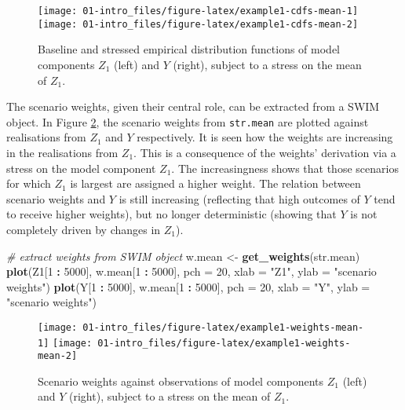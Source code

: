 \documentclass[]{article}
\newenvironment{Shaded}{\begin{snugshade}}{\end{snugshade}}
\newcommand{\CommentTok}[1]{\textcolor[rgb]{0.56,0.35,0.01}{\textit{#1}}}
\newcommand{\DataTypeTok}[1]{\textcolor[rgb]{0.13,0.29,0.53}{#1}}
\newcommand{\DecValTok}[1]{\textcolor[rgb]{0.00,0.00,0.81}{#1}}
\newcommand{\KeywordTok}[1]{\textcolor[rgb]{0.13,0.29,0.53}{\textbf{#1}}}
\newcommand{\NormalTok}[1]{#1}
\newcommand{\OperatorTok}[1]{\textcolor[rgb]{0.81,0.36,0.00}{\textbf{#1}}}
\newcommand{\StringTok}[1]{\textcolor[rgb]{0.31,0.60,0.02}{#1}}
\begin{document}
\begin{figure}
\texttt{[image: 01-intro\_files/figure-latex/example1-cdfs-mean-1]} \texttt{[image: 01-intro\_files/figure-latex/example1-cdfs-mean-2]} \caption{Baseline and stressed empirical distribution functions of model components  $Z_1$ (left) and $Y$ (right), subject to a stress on the mean of $Z_1$.}\label{fig:example1-cdfs-mean}
\end{figure}

The scenario weights, given their central role, can be extracted from a SWIM object. In Figure \ref{fig:example1-weights-mean}, the scenario weights from \texttt{str.mean} are plotted against realisations from \(Z_1\) and \(Y\) respectively. It is seen how the weights are increasing in the realisations from \(Z_1\). This is a consequence of the weights' derivation via a stress on the model component \(Z_1\). The increasingness shows that those scenarios for which \(Z_1\) is largest are assigned a higher weight. The relation between scenario weights and \(Y\) is still increasing (reflecting that high outcomes of \(Y\) tend to receive higher weights), but no longer deterministic (showing that \(Y\) is not completely driven by changes in \(Z_1\)).

\begin{Shaded}
\begin{Highlighting}[]
\CommentTok{# extract weights from SWIM object}
\NormalTok{w.mean <-}\StringTok{ }\KeywordTok{get_weights}\NormalTok{(str.mean)}
\KeywordTok{plot}\NormalTok{(Z1[}\DecValTok{1} \OperatorTok{:}\StringTok{ }\DecValTok{5000}\NormalTok{], w.mean[}\DecValTok{1} \OperatorTok{:}\StringTok{ }\DecValTok{5000}\NormalTok{], }\DataTypeTok{pch =} \DecValTok{20}\NormalTok{, }\DataTypeTok{xlab =} \StringTok{"Z1"}\NormalTok{, }\DataTypeTok{ylab =} \StringTok{"scenario weights"}\NormalTok{)}
\KeywordTok{plot}\NormalTok{(Y[}\DecValTok{1} \OperatorTok{:}\StringTok{ }\DecValTok{5000}\NormalTok{], w.mean[}\DecValTok{1} \OperatorTok{:}\StringTok{ }\DecValTok{5000}\NormalTok{], }\DataTypeTok{pch =} \DecValTok{20}\NormalTok{, }\DataTypeTok{xlab =} \StringTok{"Y"}\NormalTok{, }\DataTypeTok{ylab =} \StringTok{"scenario weights"}\NormalTok{)}
\end{Highlighting}
\end{Shaded}

\begin{figure}
\texttt{[image: 01-intro\_files/figure-latex/example1-weights-mean-1]} \texttt{[image: 01-intro\_files/figure-latex/example1-weights-mean-2]} \caption{Scenario weights against observations of model components  $Z_1$ (left) and $Y$ (right), subject to a stress on the mean of $Z_1$.}\label{fig:example1-weights-mean}
\end{figure}
\end{document}
